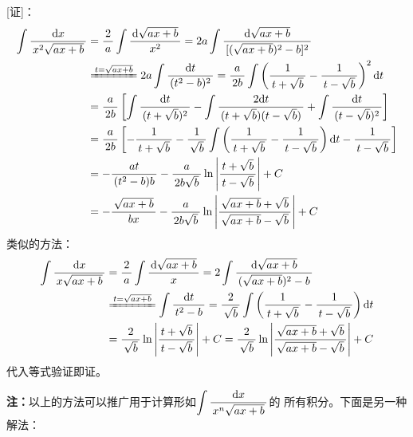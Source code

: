 [证]：
\begin{align*}
	\dint\df{\d x}{x^2\sqrt{ax+b}}&=\df2a\dint\df{\d\sqrt{ax+b}}{x^2}
	=2a\dint\df{\d\sqrt{ax+b}}{[(\sqrt{ax+b})^2-b]^2}\\
	&\xlongequal{t=\sqrt{ax+b}}2a\dint\df{\d t}{(t^2-b)^2}
	=\df{a}{2b}\dint\left(\df1{t+\sqrt b}-\df1{t-\sqrt b}\right)^2\d t\\
	&=\df{a}{2b}\left[\dint\df{\d t}{(t+\sqrt b)^2}
	-\dint\df{2\d t}{(t+\sqrt b)(t-\sqrt b)}
	+\dint\df{\d t}{(t-\sqrt b)^2}\right]\\
	&=\df{a}{2b}\left[-\df1{t+\sqrt b}-\df1{\sqrt b}
	\dint\left(\df1{t+\sqrt b}-\df1{t-\sqrt b}\right)\d t
	-\df1{t-\sqrt b}\right]\\
	&=-\df{at}{(t^2-b)b}-\df{a}{2b\sqrt b}
	\ln\left|\df{t+\sqrt b}{t-\sqrt b}\right|+C\\
	&=-\df{\sqrt{ax+b}}{bx}-\df{a}{2b\sqrt b}
	\ln\left|\df{\sqrt{ax+b}+\sqrt b}{\sqrt{ax+b}-\sqrt b}\right|+C
\end{align*}
类似的方法：
\begin{align*}
	\dint\df{\d x}{x\sqrt{ax+b}}&=\df2a\dint\df{\d\sqrt{ax+b}}{x}
	=2\dint\df{\d\sqrt{ax+b}}{(\sqrt{ax+b})^2-b}\\
	&\xlongequal{t=\sqrt{ax+b}}\dint\df{\d t}{t^2-b}
	=\df2{\sqrt b}\dint\left(\df1{t+\sqrt b}-\df1{t-\sqrt b}\right)\d t\\
	&=\df2{\sqrt b}\ln\left|\df{t+\sqrt b}{t-\sqrt b}\right|+C
	=\df2{\sqrt b}\ln\left|\df{\sqrt{ax+b}+\sqrt b}{\sqrt{ax+b}-\sqrt b}\right|+C
\end{align*}
代入等式验证即证。

{\bf 注：}以上的方法可以推广用于计算形如$\displaystyle\int\displaystyle\frac{\,{\mathrm{d} x}\,}{\,{x^n\sqrt{ax+b}}\,}$的
所有积分。下面是另一种解法：

\begin{center}
\end{center}